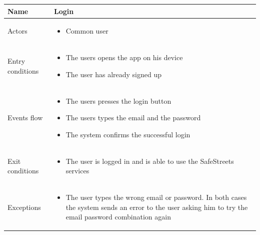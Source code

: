 \documentclass[a4paper]{article}
\begin{document}
\begin{table}[H]
\centering
\begin{tabularx}{\textwidth}{|l|X|}
\hline
Name & Login\tabularnewline
\hline
Actors &
\begin{itemize}[nosep,leftmargin=*]
\item Common user
\end{itemize}
\tabularnewline
\hline
Entry conditions &
\begin{itemize}[nosep,leftmargin=*]
\item The users opens the app on his device
\item The user has already signed up
\end{itemize}
\tabularnewline
\hline
Events flow &
\begin{itemize}[nosep,leftmargin=*]
\item The users presses the login button
\item The users types the email and the password
\item The system confirms the successful login
\end{itemize}
\tabularnewline
\hline
Exit conditions &
\begin{itemize}[nosep,leftmargin=*]
\item The user is logged in and is able to use the SafeStreets services
\end{itemize}
\tabularnewline
\hline
Exceptions &
\begin{itemize}[nosep,leftmargin=*]
\item The user types the wrong email or password. In both cases the system
sends an error to the user asking him to try the email password
combination again
\end{itemize}
\tabularnewline
\hline
\end{tabularx}
\end{table}
\end{document}
